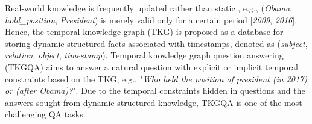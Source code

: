\documentclass[11pt]{article}
\begin{document}
Real-world knowledge is frequently updated rather than static \cite{wiki,ICEWS}, e.g., (\textit{Obama}, \textit{hold\_position}, \textit{President}) is merely valid only for a certain period [\textit{2009}, \textit{2016}]. Hence, the temporal knowledge graph (TKG) is proposed as a database for storing dynamic structured facts associated with timestamps, denoted as (\textit{subject}, \textit{relation}, \textit{object}, \textit{timestamp}).
Temporal knowledge graph question answering (TKGQA) aims to answer a natural question with explicit or implicit temporal constraints based on the TKG, e.g., "\textit{Who held the position of president (in 2017) or (after Obama)?}". 
Due to the temporal constraints hidden in questions and the answers sought from dynamic structured knowledge, TKGQA is one of the most challenging QA tasks.

\end{document}
